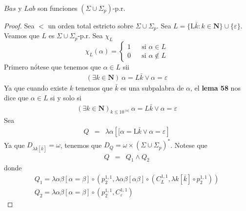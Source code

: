   \begin{lemma}
    \(Bas\) y \(Lab\) son funciones \((\Sigma \cup \Sigma _{p})\)-p.r.

  \begin{proof}
    Sea \(< \) un orden total estricto sobre \(\Sigma \cup \Sigma _{p}\). Sea \(L=\{ \mathrm{L}\bar{k}:k\in \mathbf{N}\}
    \cup \{\varepsilon \}\). Veamos que $ L $ es \(\Sigma \cup \Sigma _{p}\)-p.r.
    Sea $\chi_L$
    \[
      \displaystyle \chi_L(\alpha)=\left\{\begin{array}{lll} 
                                            1 & & \text{si }\alpha\in L\\
                                            0 & & \text{si }\alpha\notin L
                                          \end{array}\right.
    \]
    Primero nótese que tenemos que $\alpha \in L$ sii
    \[  
      \begin{array}{lll}
        (\exists k \in \mathbf{N})\ \alpha = L\bar{k} \lor \alpha = \varepsilon
      \end{array}
    \]
    Ya que cuando existe \(k\) tenemos que \(\bar{k}\) es una subpalabra de \(\alpha \), el \textbf{lema 58} nos dice 
    que \(\alpha \in L\) si y solo si
    \[  
      \begin{array}{lll}
        (\exists k \in \mathbf{N})_{k\leq 10^{\ \left\vert \alpha \right \vert}}\ \alpha = L\bar{k} \lor \alpha = \varepsilon
      \end{array}
    \]
    Sea
    \[
      \begin{array}{lll}
        Q & = & \lambda \alpha\left[
                                \lbrack \alpha = \mathrm{L}\bar{k} \lor \alpha = \varepsilon
                              \right]
      \end{array}
    \]
    Ya que \(D_{\lambda k\left[ \bar{k}\right] }=\omega \), tenemos que 
    \( D_{Q}=\omega \times (\Sigma \cup \Sigma _{p})^{\ast } \).
    Notese que
    \[
      \begin{array}{lll}
        Q & = & Q_1 \land Q_2
      \end{array}
    \]
    donde
    \[
      \begin{array}{lll}
        \displaystyle Q_1 = \lambda \alpha \beta \left[ \alpha =\beta \right] \circ
        \left( p_{2}^{1,1},
        \lambda \alpha \beta \left[ \alpha\beta \right] \circ (C_{L}^{1,1},\lambda k\left[ \bar{k}\right] 
        \circ p_{2}^{1,1})
        \right) \\
        Q_2 = \lambda \alpha \beta \left[ \alpha =\beta \right] \circ (p_{2}^{1,1}, C_{\varepsilon}^{1,1})

\end{array}\]
\end{proof}
\end{lemma}

